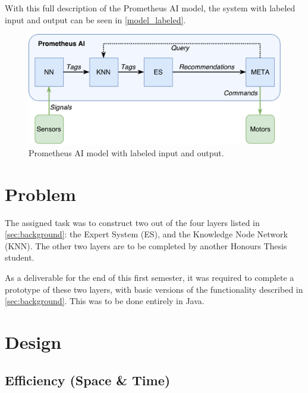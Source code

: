 \documentclass[titlepage,11pt]{article}
\begin{document}
With this full description of the Prometheus AI model, the system with labeled input and output can be seen in \autoref{model_labeled}.

\begin{figure}[!htb]
	\includegraphics[width=\columnwidth]{figures/ai_model_labeled.pdf}
	\caption{Prometheus AI model with labeled input and output.}
	\label{model_labeled}
\end{figure}

\section{Problem}

The assigned task was to construct two out of the four layers listed in \autoref{sec:background}: the Expert System (ES), and the Knowledge Node Network (KNN). The other two layers are to be completed by another Honours Thesis student.

As a deliverable for the end of this first semester, it was required to complete a prototype of these two layers, with basic versions of the functionality described in \autoref{sec:background}. This was to be done entirely in Java.

\section{Design}



\subsection{Efficiency (Space \& Time)}
\end{document}
